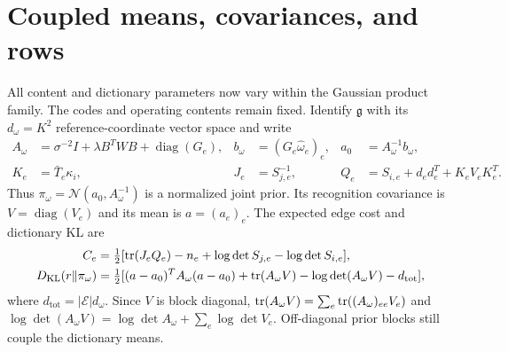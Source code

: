 \section{Coupled means, covariances, and rows}
\label{it2:ch-coupled}

All content and dictionary parameters now vary within the Gaussian product family. The codes and operating contents remain fixed. Identify $\mathfrak g$ with its $d_\omega=K^2$ reference-coordinate vector space and write
\begin{equation}
 \begin{aligned}
 A_\omega&=\sigma^{-2}I+\lambda B^TWB+\operatorname{diag}(G_e),&
 b_\omega&=(G_e\hat\omega_e)_e,& a_0&=A_\omega^{-1}b_\omega,\\
 K_e&=\bar T_e\kappa_i,& J_e&=S_{j,e}^{-1},&
 Q_e&=S_{i,e}+d_ed_e^T+K_eV_eK_e^T .
 \end{aligned}
 \label{it2:coupled-data}
\end{equation}
Thus $\pi_\omega=\mathcal N(a_0,A_\omega^{-1})$ is a normalized joint prior. Its recognition covariance is $V=\operatorname{diag}(V_e)$ and its mean is $a=(a_e)_e$. The expected edge cost and dictionary KL are
\begin{equation}
 \begin{aligned}
 C_e&=\tfrac12[\operatorname{tr}(J_eQ_e)-n_e+\log\det S_{j,e}-\log\det S_{i,e}],\\
 D_{\mathrm{KL}}(r\Vert\pi_\omega)
 &=\tfrac12[(a-a_0)^TA_\omega(a-a_0)+\operatorname{tr}(A_\omega V)
                      -\log\det(A_\omega V)-d_{\mathrm{tot}}],
 \end{aligned}
 \label{it2:coupled-costs}
\end{equation}
where $d_{\mathrm{tot}}=|\mathcal E|d_\omega$. Since $V$ is block diagonal, $\operatorname{tr}(A_\omega V)=\sum_e\operatorname{tr}((A_\omega)_{ee}V_e)$ and $\log\det(A_\omega V)=\log\det A_\omega+\sum_e\log\det V_e$. Off-diagonal prior blocks still couple the dictionary means.

